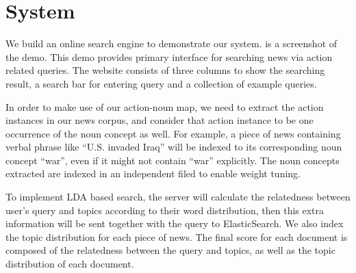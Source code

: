 \section{System}

We build an online search engine to demonstrate our system.
 is a screenshot of the demo. This demo provides
primary interface for searching news via action related queries.
The website consists of three columns to show the searching
result, a search bar for entering query and a collection of example queries.

In order to make use of our action-noun map, we need to extract the action
instances in our news corpus, and consider that action instance to be one occurrence of the
noun concept as well. For example, a piece of news containing verbal phrase like
``U.S. invaded Iraq'' will be indexed to its corresponding noun concept ``war'', even if it might not contain ``war'' explicitly.
The noun concepts extracted are indexed in an independent filed to enable weight tuning.

To implement LDA based search, the server will calculate the relatedness between user's query and topics according
to their word distribution, then this extra information will be sent together with the query to ElasticSearch.
 We also index the topic distribution for each piece of news. The final score for each document is composed of the relatedness
 between the query and topics, as well as the topic distribution of each document.
